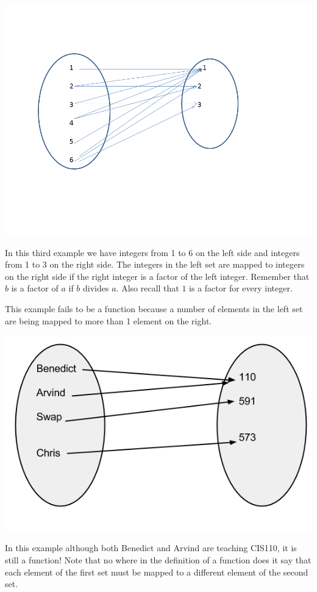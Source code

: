 \documentclass[12pt]{article}
\begin{document}
\includegraphics[scale=0.5]{./img/func3.png}

In this third example we have integers from 1 to 6 on the left side and integers from 1 to 3 on the right side. 
The integers in the left set are mapped to integers on the right side if the right integer is a factor of the left integer. Remember that $b$ is a factor of $a$ if $b$ divides $a$. Also recall that $1$ is a factor for every integer.

This example fails to be a function because a number of elements in the left set are being mapped to more than 1 element on the right.

\includegraphics[scale=0.5]{./img/stillAFunc.png}

In this example although both Benedict and Arvind are teaching CIS110, it is still a function! Note that no where in the definition of a function does it say that each element of the first set must be mapped to a different element of the second set.
\end{document}
